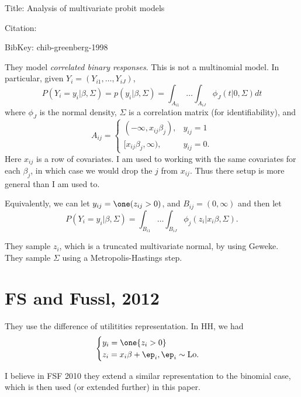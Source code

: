 \documentclass{article}
\begin{document}
Title: Analysis of multivariate probit models

Citation: \cite{chib-greenberg-1998}

BibKey: chib-greenberg-1998

They model \emph{correlated binary responses}.  This is not a multinomial
model.  In particular, given $Y_i = (Y_{i1}, \ldots, Y_{iJ})$,
\[
P(Y_i = y_i | \beta, \Sigma) = p(y_i | \beta, \Sigma) = 
\int_{A_{i1}} \ldots \int_{A_{iJ}} \phi_J(t | 0, \Sigma) dt
\]
where $\phi_J$ is the normal density, $\Sigma$ is a correlation matrix (for
identifiability), and
\[
A_{ij} = 
\begin{cases}
(-\infty, x_{ij} \beta_j), & y_{ij} = 1 \\
[x_{ij} \beta_j, \infty), & y_{ij} = 0.
\end{cases}
\]
Here $x_{ij}$ is a row of covariates.  I am used to working with the same
covariates for each $\beta_j$, in which case we would drop the $j$ from
$x_{ij}$.  Thus there setup is more general than I am used to.

Equivalently, we can let $y_{ij} = \one (z_{ij} > 0)$, and $B_{ij} = (0,
\infty)$ and then let
\[
P(Y_i = y_i | \beta, \Sigma) = \int_{B_{i1}} \ldots \int_{B_{iJ}} \phi_j(z_i |
x_i \beta, \Sigma).
\]

They sample $z_i$, which is a truncated multivariate normal, by using Geweke.
They sample $\Sigma$ using a Metropolis-Hastings step.

\section{FS and Fussl, 2012}

They use the difference of utilitities representation.  In HH, we had
\[
\begin{cases}
y_i = \one \{ z_i > 0 \} \\
z_i = x_i \beta + \ep_i, \ep_i \sim \text{Lo}.
\end{cases}
\]

I believe in FSF 2010 they extend a similar representation to the binomial case,
which is then used (or extended further) in this paper.
\end{document}
